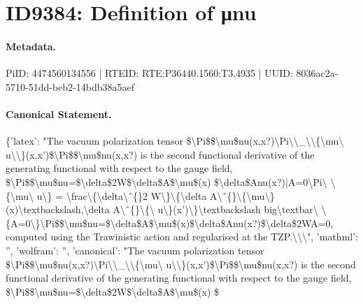 \section*{ID9384: Definition of μnu}
\paragraph{Metadata.}
PiID: 4474560134556 | RTEID: RTE:P36440.1560:T3.4935 | UUID: 8036ac2a-5710-51dd-beb2-14bdb38a5aef

\paragraph{Canonical Statement.}
\{'latex': "The vacuum polarization tensor \$\textbackslash{}Pi\$\$\textbackslash{}mu\$nu(x,x?)\textbackslash{}Pi\textbackslash{}\textbackslash{}\_\textbackslash{}\textbackslash{}\{\textbackslash{}mu\textbackslash{} u\textbackslash{}\textbackslash{}\}(x,x')\$\textbackslash{}Pi\$\$\textbackslash{}mu\$nu(x,x?) is the second functional derivative of the generating functional with respect to the gauge field, \$\textbackslash{}Pi\$\$\textbackslash{}mu\$nu=\$\textbackslash{}delta\$2W\$\textbackslash{}delta\$A\$\textbackslash{}mu\$(x) \$\textbackslash{}delta\$Anu(x?)|A=0\textbackslash{}Pi\textbackslash{} \textbackslash{}\{\textbackslash{}mu\textbackslash{} u\textbackslash{}\} = \textbackslash{}frac\textbackslash{}\{\textbackslash{}delta\textbackslash{}ˆ\{\}2 W\textbackslash{}\}\textbackslash{}\{\textbackslash{}delta A\textbackslash{}ˆ\{\}\textbackslash{}\{\textbackslash{}mu\textbackslash{}\}(x)\textbackslash{}textbackslash,\textbackslash{}delta A\textbackslash{}ˆ\{\}\textbackslash{}\{\textbackslash{} u\textbackslash{}\}(x')\textbackslash{}\}\textbackslash{}textbackslash big\textbackslash{}textbar\textbackslash{} \textbackslash{}\{A=0\textbackslash{}\}\textbackslash{}Pi\$\$\textbackslash{}mu\$nu=\$\textbackslash{}delta\$A\$\textbackslash{}mu\$(x)\$\textbackslash{}delta\$Anu(x?)\$\textbackslash{}delta\$2WA=0, computed using the Trawinistic action and regularised at the TZP.\textbackslash{}\textbackslash{}\textbackslash{}", 'mathml': '', 'wolfram': '', 'canonical': "The vacuum polarization tensor \$\textbackslash{}Pi\$\$\textbackslash{}mu\$nu(x,x?)\textbackslash{}Pi\textbackslash{}\textbackslash{}\_\textbackslash{}\textbackslash{}\{\textbackslash{}mu\textbackslash{} u\textbackslash{}\textbackslash{}\}(x,x')\$\textbackslash{}Pi\$\$\textbackslash{}mu\$nu(x,x?) is the second functional derivative of the generating functional with respect to the gauge field, \$\textbackslash{}Pi\$\$\textbackslash{}mu\$nu=\$\textbackslash{}delta\$2W\$\textbackslash{}delta\$A\$\textbackslash{}mu\$(x) \$

